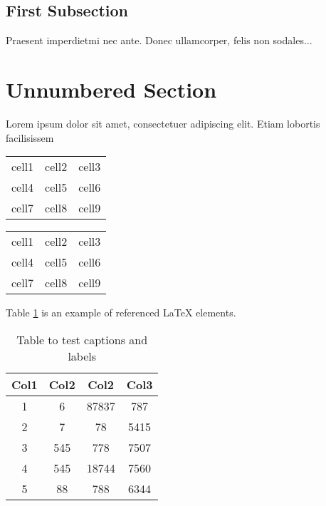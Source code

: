 \documentclass[12pt, a4paper ]{article}
\begin{document}
\subsection{First Subsection}
Praesent imperdietmi nec ante. Donec ullamcorper, felis non sodales...

\section*{Unnumbered Section}
Lorem ipsum dolor sit amet, consectetuer adipiscing elit.  
Etiam lobortis facilisissem







\begin{center}
\begin{tabular}{ c c c }
 cell1 & cell2 & cell3 \\
 cell4 & cell5 & cell6 \\  
 cell7 & cell8 & cell9    
\end{tabular}
\end{center}



\begin{center}
\begin{tabular}{ |c|c|c| } 
 \hline
 cell1 & cell2 & cell3 \\ 
 cell4 & cell5 & cell6 \\ 
 cell7 & cell8 & cell9 \\ 
 \hline
\end{tabular}
\end{center}




Table \ref{table:data} is an example of referenced \LaTeX{} elements.

\begin{table}[h!]
\centering
\begin{tabular}{||c c c c||} 
 \hline
 Col1 & Col2 & Col2 & Col3 \\ [0.5ex] 
 \hline\hline
 1 & 6 & 87837 & 787 \\ 
 2 & 7 & 78 & 5415 \\
 3 & 545 & 778 & 7507 \\
 4 & 545 & 18744 & 7560 \\
 5 & 88 & 788 & 6344 \\ [1ex] 
 \hline
\end{tabular}
\caption{Table to test captions and labels}
\label{table:data}
\end{table}
\end{document}
